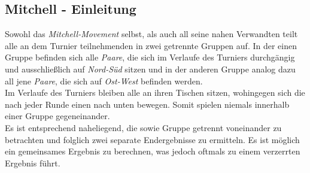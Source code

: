 \subsection{Mitchell - Einleitung}\label{mitchell}

\noindent
Sowohl das \textit{Mitchell-Movement} selbst, als auch all seine nahen Verwandten teilt alle an dem Turnier teilnehmenden \pas in zwei getrennte Gruppen auf. In der einen Gruppe befinden sich alle \textit{Paare}, die sich im Verlaufe des Turniers durchgängig und ausschließlich auf \textit{Nord-Süd} sitzen und in der anderen Gruppe analog dazu all jene \textit{Paare}, die sich auf \textit{Ost-West} befinden werden.\\[.1cm]
Im Verlaufe des Turniers bleiben alle \ns \pas an ihren Tischen sitzen, wohingegen sich die \ew \pas nach jeder Runde einen \ti nach unten bewegen. Somit spielen niemals \pas innerhalb einer Gruppe gegeneinander.\\[.1cm]
Es ist entsprechend naheliegend, die \ns sowie \ew Gruppe getrennt voneinander zu betrachten und folglich zwei separate Endergebnisse zu ermitteln. Es ist möglich ein gemeinsames Ergebnis zu berechnen, was jedoch oftmals zu einem verzerrten Ergebnis führt.

